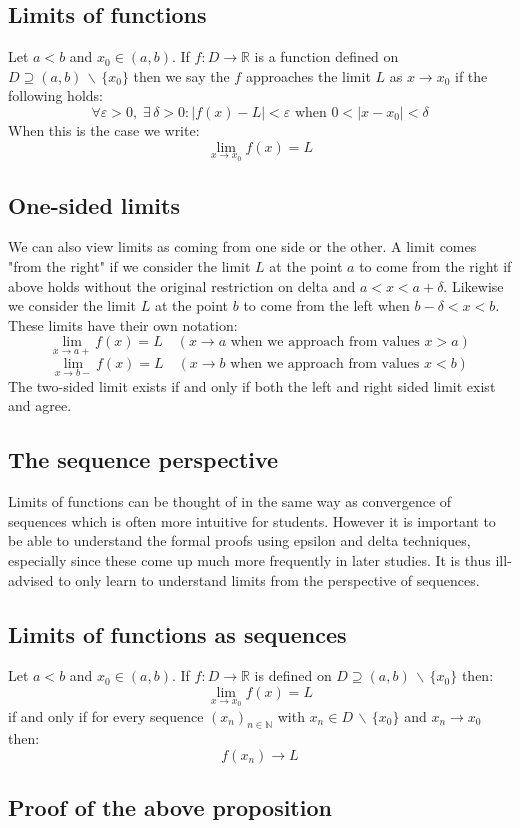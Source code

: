 \documentclass[12pt]{article}
\newcommand{\seq}[2]{(#1_#2)_{#2\in\mathbb{N}}}
\begin{document}
\subsection*{Limits of functions}
Let \(a<b\) and \(x_0\in(a,b)\). If \(f:D\to\mathbb{R}\) is a function defined on \(D\supseteq (a,b)\,\backslash\,\{x_0\}\) then we say the \(f\) approaches the limit \(L\) as \(x\to x_0\) if the following holds:
\[\forall\varepsilon>0,\;\exists\,\delta>0:|f(x)-L|<\varepsilon\text{ when }0<|x-x_0|<\delta\]
When this is the case we write:
\[\lim_{x\to x_0}f(x)=L\]
\subsection*{One-sided limits}
We can also view limits as coming from one side or the other. A limit comes "from the right" if we consider the limit \(L\) at the point \(a\) to come from the right if above holds without the original restriction on delta and \(a<x<a+\delta\). Likewise we consider the limit \(L\) at the point \(b\) to come from the left when \(b-\delta<x<b\). These limits have their own notation:
\[\lim_{x\to a+}f(x)=L\quad( x\to a\text{ when we approach from values }x>a)\]
\[\lim_{x\to b-}f(x)=L\quad( x\to b\text{ when we approach from values }x<b)\]
The two-sided limit exists if and only if both the left and right sided limit exist and agree.
\subsection*{The sequence perspective}
Limits of functions can be thought of in the same way as convergence of sequences which is often more intuitive for students. However it is important to be able to understand the formal proofs using epsilon and delta techniques, especially since these come up much more frequently in later studies. It is thus ill-advised to only learn to understand limits from the perspective of sequences.
\subsection*{Limits of functions as sequences}
Let \(a<b\) and \(x_0\in (a,b)\). If \(f:D\to\mathbb{R}\) is defined on \(D\supseteq (a,b)\,\backslash\,\{x_0\}\) then:
\[\lim_{x\to x_0}f(x)=L\]
if and only if for every sequence \(\seq{x}{n}\) with \(x_n\in D\,\backslash\,\{x_0\}\) and \(x_n\to x_0\) then:
\[f(x_n)\to L\]
\subsection*{Proof of the above proposition}
\end{document}
